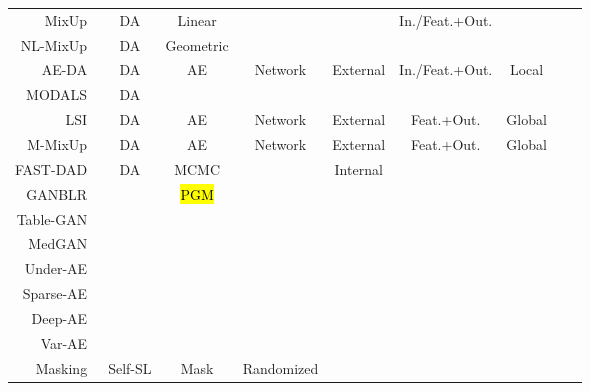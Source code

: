 \documentclass[parskip=full]{scrartcl}
\begin{document}
\begin{longtable}{rcccccccc}
    MixUp~\cite{zhang2018mixup} & DA & Linear & & & In./Feat.+Out.\\
    NL-MixUp~\cite{guo2020nonlinear} & DA & Geometric \\
    AE-DA~\cite{feng2020autuencoder} & DA & AE & Network & External & In./Feat.+Out. & Local \\
    MODALS~\cite{cheung2020modals} & DA & \\
    LSI~\cite{liu2018data} & DA & AE & Network & External & Feat.+Out. & Global \\
    M-MixUp~\cite{verma2019manifold} & DA & AE & Network & External & Feat.+Out. & Global \\
    FAST-DAD~\cite{fakoor2020fast} & DA & MCMC & & Internal \\
    GANBLR~\cite{zhang2021ganblr} & & \hl{PGM}\\
    Table-GAN~\cite{park2018data} & & \\
    MedGAN~\cite{armanious2020medgan} \\
    Under-AE~\cite{delgado2021deep} \\
    Sparse-AE~\cite{delgado2021deep} \\
    Deep-AE~\cite{delgado2021deep} \\
    Var-AE~\cite{delgado2021deep} \\
    Masking~\cite{yoon2020vime} & Self-SL & Mask & Randomized \\
\end{longtable}
\endgroup


% 
% 
% 
\end{document}
